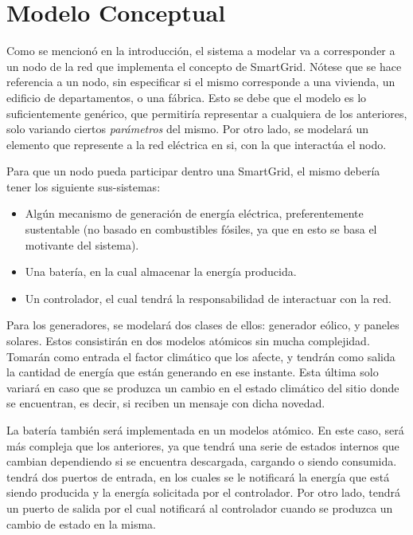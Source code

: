 \section{Modelo Conceptual} \label{section:modeloConceptual}

Como se mencionó en la introducción, el sistema a modelar va a corresponder a
un nodo de la red que implementa el concepto de SmartGrid. Nótese que se hace
referencia a un nodo, sin especificar si el mismo corresponde a una vivienda,
un edificio de departamentos, o una fábrica. Esto se debe que el modelo es lo
suficientemente genérico, que permitiría representar a cualquiera de los
anteriores, solo variando ciertos \textit{parámetros} del mismo. Por otro
lado, se modelará un elemento que represente a la red eléctrica en si, con la
que interactúa el nodo.

Para que un nodo pueda participar dentro una SmartGrid, el mismo debería
tener los siguiente sus-sistemas:
\begin{itemize}
    \item Algún mecanismo de generación de energía eléctrica, preferentemente
    sustentable (no basado en combustibles fósiles, ya que en esto se basa el
    motivante del sistema).
    \item Una batería, en la cual almacenar la energía producida.
    \item Un controlador, el cual tendrá la responsabilidad de interactuar con la red.
\end{itemize}

Para los generadores, se modelará dos clases de ellos: generador eólico, y
paneles solares. Estos consistirán en dos modelos atómicos sin mucha
complejidad. Tomarán como entrada el factor climático que los afecte, y
tendrán como salida la cantidad de energía que están generando en ese
instante. Esta última solo variará en caso que se produzca un cambio en el
estado climático del sitio donde se encuentran, es decir, si reciben un
mensaje con dicha novedad.

La batería también será implementada en un modelos atómico. En este caso,
será más compleja que los anteriores, ya que tendrá una serie de estados
internos que cambian dependiendo si se encuentra descargada, cargando o
siendo consumida. tendrá dos puertos de entrada, en los cuales se le
notificará la energía que está siendo producida y la energía solicitada por
el controlador. Por otro lado, tendrá un puerto de salida por el cual
notificará al controlador cuando se produzca un cambio de estado en la misma.

